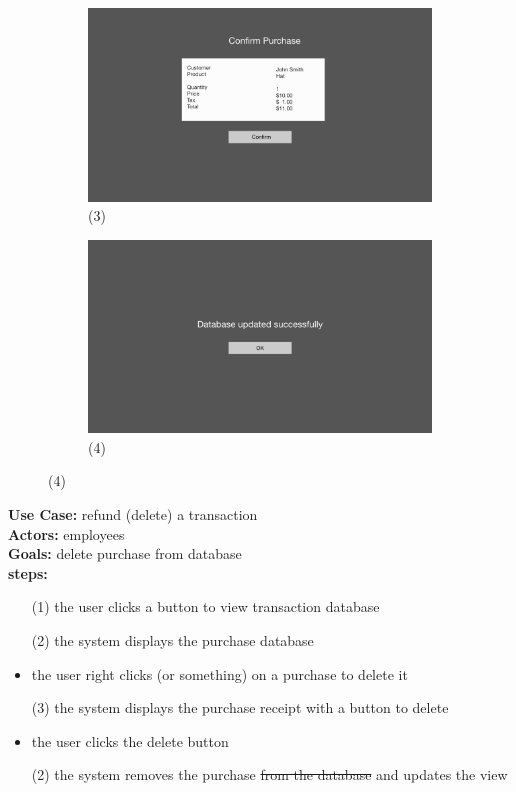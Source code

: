 \documentclass[notitlepage,11pt]{article}
\begin{document}
\begin{figure}[h]
	\begin{subfigure}{.5\textwidth}
	\centering
	\includegraphics[scale=0.12]{PurchaseConfirm}
	\caption{(3)}
	\end{subfigure}%
	\begin{subfigure}{.5\textwidth}
	\centering
	\includegraphics[scale=0.12]{Success}
	\caption{(4)}
	\end{subfigure}
\end{figure}
	\textbf{Use Case:} refund (delete) a transaction\\
	\textbf{Actors:} employees\\
	\textbf{Goals:} delete purchase from database\\
	\textbf{steps:}
	\begin{itemize}
		\item[(1)] the user clicks a button to view transaction database
		\item[(2)] the system displays the purchase database
		\item the user right clicks (or something) on a purchase to delete it
		\item[(3)] the system displays the purchase receipt with a button to delete
		\item the user clicks the delete button
		\item[(2)] the system removes the purchase \sout{from the database} and updates the view
	\end{itemize}
\end{document}
